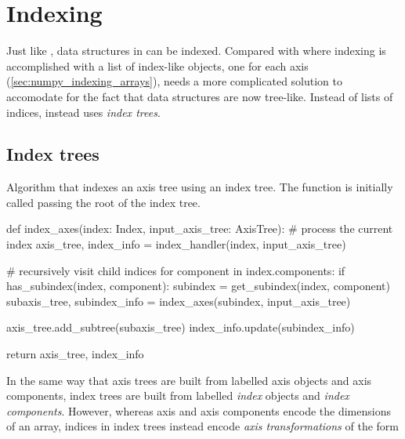 \documentclass[thesis]{subfiles}
\begin{document}
\chapter{Indexing}
\label{chapter:indexing}


Just like \numpy, data structures in  can be indexed.
Compared with \numpy where indexing is accomplished with a list of index-like objects, one for each axis (\cref{sec:numpy_indexing_arrays}),  needs a more complicated solution to accomodate for the fact that data structures are now tree-like.
Instead of lists of indices,  instead uses \emph{index trees}.

\section{Index trees}
\label{sec:index_trees}

\begin{algorithm}
  \caption{
    Algorithm that indexes an axis tree using an index tree.
    The function is initially called passing the root of the index tree.
  }

  \begin{pyalg2}
    def index_axes(index: Index, input_axis_tree: AxisTree):
      # process the current index
      axis_tree, index_info = index_handler(index, input_axis_tree)

      # recursively visit child indices
      for component in index.components:
        if has_subindex(index, component):
          subindex = get_subindex(index, component)
          subaxis_tree, subindex_info = index_axes(subindex, input_axis_tree)

          axis_tree.add_subtree(subaxis_tree)
          index_info.update(subindex_info)

      return axis_tree, index_info
  \end{pyalg2}

  \label{alg:index_axis_tree}
\end{algorithm}

In the same way that axis trees are built from labelled axis objects and axis components, index trees are built from labelled \emph{index} objects and \emph{index components}.
However, whereas axis and axis components encode the dimensions of an array, indices in index trees instead encode \emph{axis transformations} of the form
\end{document}
